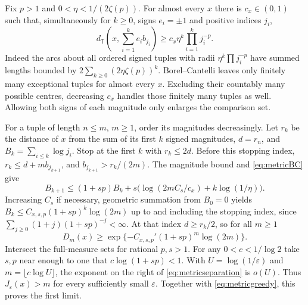 \documentclass[11pt]{article}
\theoremstyle{remark}\newtheorem{remark}[theorem]{Remark}
\begin{document}
Fix $p>1$ and $0<\eta<1/(2\zeta(p))$. For almost every $x$ there is
$c_x\in(0,1)$ such that, simultaneously for $k\ge0$, signs $e_i=\pm1$
and positive indices $j_i$,
\begin{equation}\label{eq:metricBC}
 d_{\mathbb T}\left(x,\sum_{i=1}^k e_i b_{j_i}\right)
       \ge c_x\eta^k\prod_{i=1}^k j_i^{-p}.
\end{equation}
Indeed the arcs about all ordered signed tuples with radii
$\eta^k\prod j_i^{-p}$ have summed lengths bounded by
$2\sum_{k\ge0}(2\eta\zeta(p))^k$. Borel--Cantelli leaves only finitely
many exceptional tuples for almost every $x$. Excluding their countably many
possible centres, decreasing $c_x$ handles those finitely many tuples as well.
Allowing both signs of each magnitude only enlarges the comparison set.

For a tuple of length $n\le m$, $m\ge1$, order its magnitudes decreasingly.
Let $r_k$ be the distance of $x$ from the sum of its first $k$ signed
magnitudes, $d=r_n$, and $B_k=\sum_{i\le k}\log j_i$.
Stop at the first $k$ with $r_k\le2d$. Before this stopping index,
$r_k\le d+m b_{j_{k+1}}$, and
$b_{j_{k+1}}>r_k/(2m)$. The magnitude bound and
\eqref{eq:metricBC} give
\[
 B_{k+1}\le(1+sp)B_k+
    s\bigl(\log(2m C_s/c_x)+k\log(1/\eta)\bigr).
\]
Increasing $C_s$ if necessary, geometric summation from $B_0=0$ yields
$B_k\le C_{x,s,p}(1+sp)^k\log(2m)$ up to and including the stopping
index, since $\sum_{j\ge0}(1+j)(1+sp)^{-j}<\infty$.
At that index $d\ge r_k/2$, so for all $m\ge1$
\begin{equation}\label{eq:metricseparation}
 D_m(x)\ge \exp\{-C_{x,s,p}'(1+sp)^m\log(2m)\}.
\end{equation}
Intersect the full-measure sets for rational $p,s>1$. For any
$0<c<1/\log2$ take $s,p$ near enough to one that $c\log(1+sp)<1$.
With $U=\log(1/\varepsilon)$ and $m=\lfloor c\log U\rfloor$, the exponent
on the right of \eqref{eq:metricseparation} is $o(U)$.
Thus $J_{\varepsilon}(x)>m$ for every sufficiently small $\varepsilon$.
Together with \eqref{eq:metricgreedy}, this proves the first limit.
\end{document}
